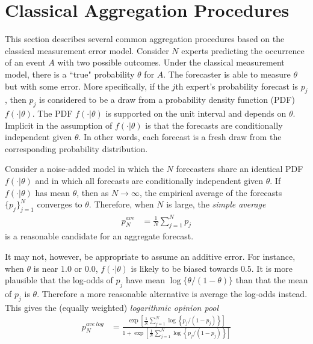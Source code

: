 \documentclass[11pt]{article}
\theoremstyle{definition}
\theoremstyle{definition}
\begin{document}
\section{Classical Aggregation Procedures}
This section describes several common aggregation procedures based on the classical measurement error model. Consider $N$ experts predicting the occurrence of an event $A$ with two possible outcomes. Under the classical measurement model, there is a ``true" probability $\theta$ for $A$. The forecaster is able to measure $\theta$ but with some error. More specifically, if the $j$th expert's probability forecast is $p_j$, then $p_j$ is considered to be a draw from a probability density function (PDF) $f(\cdot | \theta)$. The PDF $f(\cdot | \theta)$ is supported on the unit interval and depends on $\theta$. Implicit in the assumption of $f(\cdot | \theta)$ is that the forecasts are conditionally independent given $\theta$. In other words, each forecast is a fresh draw from the corresponding probability distribution. 

Consider a noise-added model in which the $N$ forecasters share an identical PDF $f(\cdot | \theta)$ and in which all forecasts are conditionally independent given $\theta$. If $f(\cdot | \theta)$ has mean $\theta$, then as $N \to \infty$, the empirical average of the forecasts $\{ p_j \}_{j=1}^N$ converges to $\theta$. Therefore, when $N$ is large, the \textit{simple average}
\begin{align*}
p_N^{ave} &= \frac{1}{N} \sum_{j=1}^N p_j
\end{align*}
is a reasonable candidate for an aggregate forecast. 

It may not, however, be appropriate to assume an additive error. For instance, when $\theta$ is near $1.0$ or $0.0$, $f(\cdot | \theta)$ is likely to be biased towards $0.5$. It is more plausible that the log-odds of $p_j$ have mean $\log\{\theta/(1-\theta)\}$ than that the mean of $p_j$ is $\theta$. Therefore a more reasonable alternative is average the log-odds instead. This gives the (equally weighted) \textit{logarithmic opinion pool}
\begin{align*}
p_N^{ave\ log} &= \frac{\exp\left[ \frac{1}{N} \sum_{j=1}^N \log\left\{p_j / (1-p_j)\right\} \right]}{1+\exp\left[ \frac{1}{N} \sum_{j=1}^N \log\left\{p_j / (1-p_j)\right\} \right]}
\end{align*}
\end{document}

